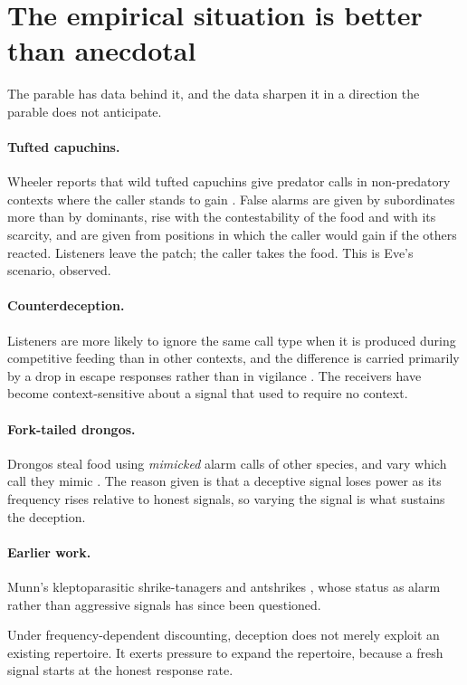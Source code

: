 \section{The empirical situation is better than anecdotal}
\label{sec:deception-empirical}

The parable has data behind it, and the data sharpen it in a direction the
parable does not anticipate.

\paragraph{Tufted capuchins.} Wheeler reports that wild tufted capuchins give
predator calls in non-predatory contexts where the caller stands to gain
\cite{wheelerbc2009}. False alarms are given by subordinates more than by
dominants, rise with the contestability of the food and with its scarcity, and
are given from positions in which the caller would gain if the others reacted.
Listeners leave the patch; the caller takes the food. This is Eve's scenario,
observed.

\paragraph{Counterdeception.} Listeners are more likely to ignore the same call
type when it is produced during competitive feeding than in other contexts, and
the difference is carried primarily by a drop in escape responses rather than in
vigilance \cite{wheelerbc2010,wheelerbc2013}. The receivers have become
context-sensitive about a signal that used to require no context.

\paragraph{Fork-tailed drongos.} Drongos steal food using \emph{mimicked} alarm
calls of other species, and vary which call they mimic
\cite{flower2011,flower2014}. The reason given is that a deceptive signal loses
power as its frequency rises relative to honest signals, so varying the signal is
what sustains the deception.

\paragraph{Earlier work.} Munn's kleptoparasitic shrike-tanagers and antshrikes
\cite{munn1986}, whose status as alarm rather than aggressive signals has since
been questioned.

\begin{observation}
\label{lie:obs:vocab}
Under frequency-dependent discounting, deception does not merely exploit an
existing repertoire. It exerts pressure to expand the repertoire, because a
fresh signal starts at the honest response rate.
\end{observation}

